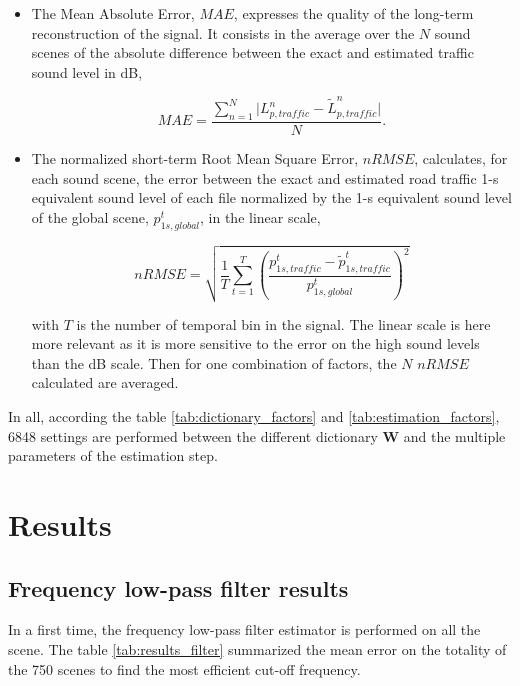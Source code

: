 \documentclass[twocolumn,a4paper,10pt]{article}
\begin{document}
\begin{itemize}

\item The Mean Absolute Error, $MAE$, expresses the quality of the long-term reconstruction of the signal. It consists in the average over the $N$ sound scenes of the absolute difference between the exact and estimated traffic sound level in dB,

\begin{equation}
MAE = \frac{\sum_{n = 1}^N\vert L^n_{p,traffic}-\tilde{L}^n_{p,traffic} \vert}{N}.
\end{equation}

\item The normalized short-term Root Mean Square Error, $nRMSE$, calculates, for each sound scene, the error between the exact and estimated road traffic 1-s equivalent sound level of each file normalized by the 1-s equivalent sound level of the global scene, $p^t_{1s,global}$, in the linear scale,

\begin{equation}
nRMSE = \sqrt{\frac{1}{T}\sum_{t = 1}^T \left(\frac{p^t_{1s,traffic}-\tilde{p}^t_{1s,traffic}}{p^t_{1s,global}}\right)^2}
\end{equation}

with $T$ is the number of temporal bin in the signal. The linear scale is here more relevant as it is more sensitive to the error on the high sound levels than the dB scale. Then for one combination of factors, the $N$ $nRMSE$ calculated are averaged.\\
\end{itemize}

In all, according the table \ref{tab:dictionary_factors} and \ref{tab:estimation_factors}, 6848 settings are performed between the different dictionary $\mathbf{W}$ and the multiple parameters of the estimation step.

\section{Results}\label{part:results}

\subsection{Frequency low-pass filter results}
In a first time, the frequency low-pass filter estimator is performed on all the scene. The table \ref{tab:results_filter} summarized the mean error on the totality of the 750 scenes to find the most efficient cut-off frequency. \\
\end{document}
